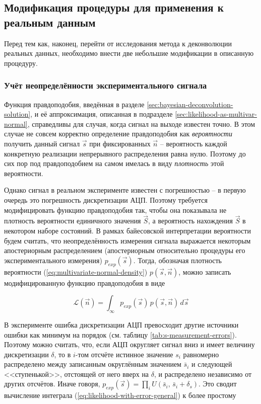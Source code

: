 \documentclass[12pt]{book}
\begin{document}
	\subsection{Модификация процедуры для применения к реальным данным}
	
	Перед тем как, наконец, перейти от исследования метода к деконволюции реальных данных, необходимо внести две небольшие модификации в описанную процедуру.
	
	\subsubsection{Учёт неопределённости экспериментального сигнала}
	
	\label{sec:likelihood-with-error-in-signal}
	
	Функция правдоподобия, введённая в разделе \ref{sec:bayesian-deconvolution-solution}, и её аппроксимация, описанная в подразделе \ref{sec:likelihood-as-multivar-normal}, справедливы для случая, когда сигнал на выходе известен точно. В этом случае не совсем корректно определение правдоподобия как \textit{вероятности} получить данный сигнал $\vec{s}$ при фиксированных $\vec{n}$ -- вероятность каждой конкретную реализации непрерывного распределения равна нулю. Поэтому до сих пор под правдоподобием на самом имелась в виду \textit{плотность} этой вероятности.
	
	Однако сигнал в реальном эксперименте известен с погрешностью -- в первую очередь это погрешность дискретизации АЦП. Поэтому требуется модифицировать функцию правдоподобия так, чтобы она показывала не плотность вероятности единичного значения $\vec{S}$, а вероятность нахождения $\vec{S}$ в некотором наборе состояний. В рамках байесовской интерпретации вероятности будем считать, что неопределённость измерения сигнала выражается некоторым апостериорным распределением (апостериорным относительно процедуры его экспериментального измерения) $p_{exp}(\vec{s})$. Тогда, обозначая плотность вероятности (\ref{eq:multivariate-normal-density}) $p(\vec{s}, \vec{n})$, можно записать модифицированную функцию правдоподобия в виде
	
	\begin{equation}
		\label{eq:likelihood-with-error-general}
		\mathcal{L}(\vec{n}) = \int_{\infty} p_{exp}(\vec{s}) \, p(\vec{s}, \vec{n}) \, d\vec{s}
	\end{equation}

	В эксперименте ошибка дискретизации АЦП превосходит другие источники ошибки как минимум на порядок (см. таблицу \ref{tab:s-measurement-errors}). Поэтому можно считать, что, если АЦП округляет сигнал вниз и имеет величину дискретизации $\delta$, то в $i$-том отсчёте истинное значение $s_i$ равномерно распределено между записанным округлённым значением $\bar{s}_i$ и следующей <<ступенькой>>, отстоящей от него вверх на $\delta$, и распределено независимо от других отсчётов. Иначе говоря, $p_{exp}(\vec{s}) = \prod_{i} U( \bar{s}_i, \, \bar{s}_i + \delta_s )$. Это сводит вычисление интеграла (\ref{eq:likelihood-with-error-general}) к более простому
	
\end{document}
